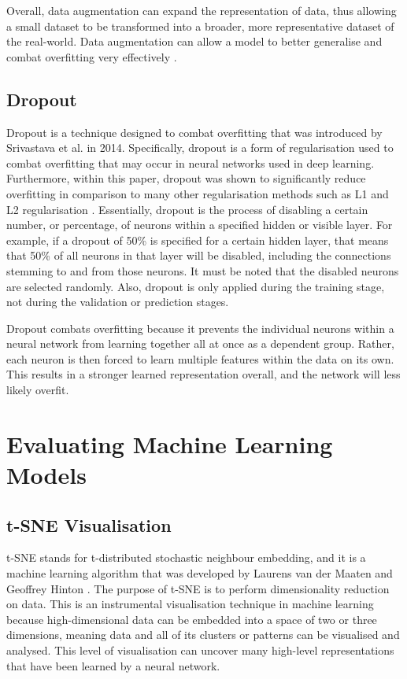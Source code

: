 \documentclass{l4proj}
\begin{document}
Overall, data augmentation can expand the representation of data, thus allowing a small dataset to be transformed into a broader, more representative dataset of the real-world.
Data augmentation can allow a model to better generalise and combat overfitting very effectively \cite{Perez2017TheEO}.

\subsection{Dropout}
Dropout is a technique designed to combat overfitting that was introduced by Srivastava et al. \cite{Srivastava:2014:DSW:2627435.2670313} in 2014.
Specifically, dropout is a form of regularisation used to combat overfitting that may occur in neural networks used in deep learning.
Furthermore, within this paper, dropout was shown to significantly reduce overfitting in comparison to many other regularisation methods such as L1 and L2 regularisation \cite{Ng:2004:FSL:1015330.1015435}.
Essentially, dropout is the process of disabling a certain number, or percentage, of neurons within a specified hidden or visible layer.
For example, if a dropout of 50\% is specified for a certain hidden layer, that means that 50\% of all neurons in that layer will be disabled, including the connections stemming to and from those neurons. 
It must be noted that the disabled neurons are selected randomly.
Also, dropout is only applied during the training stage, not during the validation or prediction stages.

Dropout combats overfitting because it prevents the individual neurons within a neural network from learning together all at once as a dependent group.
Rather, each neuron is then forced to learn multiple features within the data on its own.
This results in a stronger learned representation overall, and the network will less likely overfit.  

\section{Evaluating Machine Learning Models}

\subsection{t-SNE Visualisation}
t-SNE stands for t-distributed stochastic neighbour embedding, and it is a machine learning algorithm that was developed by Laurens van der Maaten and Geoffrey Hinton \cite{vanDerMaaten2008}.
The purpose of t-SNE is to perform dimensionality reduction on data.
This is an instrumental visualisation technique in machine learning because high-dimensional data can be embedded into a space of two or three dimensions, meaning data and all of its clusters or patterns can be visualised and analysed.
This level of visualisation can uncover many high-level representations that have been learned by a neural network.
\end{document}
